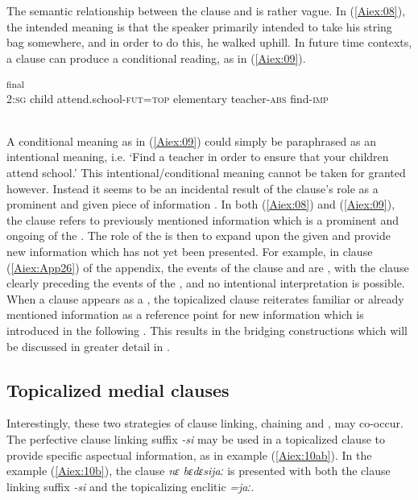 \documentclass[output=paper]{LSP/langsci}
\begin{document}
The semantic relationship between the  clause and  is rather vague. In (\ref{Aiex:08}), the intended meaning is that the speaker primarily intended to take his string bag somewhere, and in order to do this, he walked uphill. In future time contexts, a  clause can produce a conditional reading, as in (\ref{Aiex:09}).

\begin{exe}
\ex \label{Aiex:09}
\textsubscript{final}\\
2:\textsc{sg}	child	attend.school-\textsc{fut}=\textsc{top}	elementary	teacher-\textsc{abs}	find-\textsc{imp}\\
\glt {}\\
\end{exe}

A conditional meaning as in (\ref{Aiex:09}) could simply be paraphrased as an intentional meaning, i.e. `Find a teacher in order to ensure that your children attend school.'
	This intentional/conditional meaning cannot be taken for granted however. Instead it seems to be an incidental result of the  clause’s role as a prominent and given piece of information \citep{haiman.1978}. In both (\ref{Aiex:08}) and (\ref{Aiex:09}), the  clause refers to previously mentioned information which is a prominent and ongoing  of the . The role of the  is then to expand upon the given  and provide new information which has not yet been presented. For example, in clause (\ref{Aiex:App26}) of the appendix, the events of the  clause and  are , with the  clause clearly preceding the events of the , and no intentional interpretation is possible. When a clause appears as a , the topicalized clause reiterates familiar or already mentioned information as a reference point for new information which is introduced in the following . This results in the bridging constructions which will be discussed in greater detail in .

\subsection{Topicalized medial clauses} 
\label{AiTopicalized.medial}
Interestingly, these two strategies of clause linking, chaining and , may co-occur. The perfective clause linking suffix \textit{-si} may be used in a topicalized clause to provide specific aspectual information, as in example (\ref{Aiex:10ab}). In the example (\ref{Aiex:10b}), the clause \textit{nɛ bɛdɛsijaː} is presented with both the clause linking suffix \textit{-si} and the topicalizing enclitic \textit{=jaː}.
\end{document}

